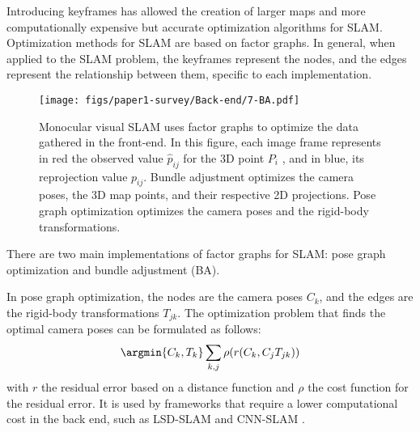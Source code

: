Introducing keyframes has allowed the creation of larger maps and more computationally expensive but accurate optimization algorithms for SLAM. Optimization methods for SLAM are based on factor graphs. In general, when applied to the \ac{SLAM} problem, the keyframes represent the nodes, and the edges represent the relationship between them, specific to each implementation.
\begin{figure}[!b]

    \centering
    \smallskip
    \texttt{[image: figs/paper1-survey/Back-end/7-BA.pdf]}

    \caption[The information processed by the SLAM's factor graph]{Monocular visual SLAM uses factor graphs to optimize the data gathered in the front-end. In this figure, each image frame represents in red the observed value $\hat{p}_{ij}$ for the 3D point $P_i$ , and in blue, its reprojection value $p_{ij}$. Bundle adjustment optimizes the camera poses, the 3D map points, and their respective 2D projections. Pose graph optimization optimizes the camera poses and the rigid-body transformations.}
    \label{fig:BA}
\end{figure}
There are two main implementations of factor graphs for SLAM: pose graph optimization and bundle adjustment (BA).


In pose graph optimization, the nodes are the camera poses $C_k$, and the edges are the rigid-body transformations $T_{jk}$. The optimization problem that finds the optimal camera poses can be formulated as follows:    
\begin{equation}
        \argmin{C_k,T_k} \sum_{k,j} \rho(r(C_k,C_jT_{jk})) 
    \end{equation}
     with $r$ the residual error based on a distance function and $\rho$ the cost function for the residual error. It is used by frameworks that require a lower computational cost in the back end, such as LSD-SLAM \cite{engel2014lsd} and CNN-SLAM \cite{tateno2017cnnslam}.

